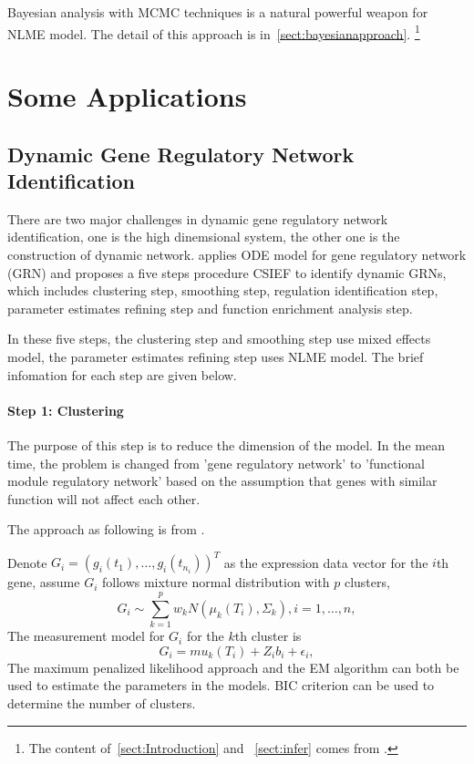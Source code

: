 \documentclass[12pt]{extarticle}
\begin{document}
Bayesian analysis with MCMC techniques is a natural powerful weapon for NLME model. The detail of this approach is in~\ref{sect:bayesianapproach}.  \footnote{The content of~\ref{sect:Introduction} and ~\ref{sect:infer} comes from \cite{Davidian03}.}

\section{Some Applications}
\label{sect:application}

\subsection{Dynamic Gene Regulatory Network Identification}
\label{sect:network}
There are two major challenges in dynamic gene regulatory network identification, one is the high dinemsional system, the other one is the construction of dynamic network. \cite{Lu11}  applies ODE model for gene regulatory network (GRN) and proposes a five steps procedure CSIEF to identify dynamic GRNs, which includes clustering step, smoothing step, regulation identification step, parameter estimates refining step and function enrichment analysis step.

In these five steps, the clustering step and smoothing step use mixed effects model, the parameter estimates refining step uses NLME model. The brief infomation for each step are given below.

\paragraph{Step 1: Clustering}
The purpose of this step is to reduce the dimension of the model. In the mean time, the problem is changed from 'gene regulatory network' to 'functional module regulatory network' based on the assumption that genes with similar function will not affect each other.

The approach as following is from  \cite{Ma08}.

Denote $G_i={(g_{i}(t_{1}),\ldots,g_{i}(t_{n_i}))}^T$ as the expression data vector for the $i$th gene, assume $G_i$ follows mixture normal distribution with $p$ clusters,
\begin{equation}
G_{i}\sim{}\sum_{k=1}^{p}w_{k}N(\mu_{k}(T_{i}),\Sigma_{k}), i=1,\ldots,n,
\end{equation}
The measurement model for $G_i$ for the $k$th cluster is
\begin{equation}
G_i=mu_{k}(T_{i})+Z_{i}b_{i}+\epsilon_{i},
\end{equation}
The maximum penalized likelihood approach and the EM algorithm can both be used to estimate the parameters in the models. BIC criterion can be used to determine the number of clusters.
\end{document}
